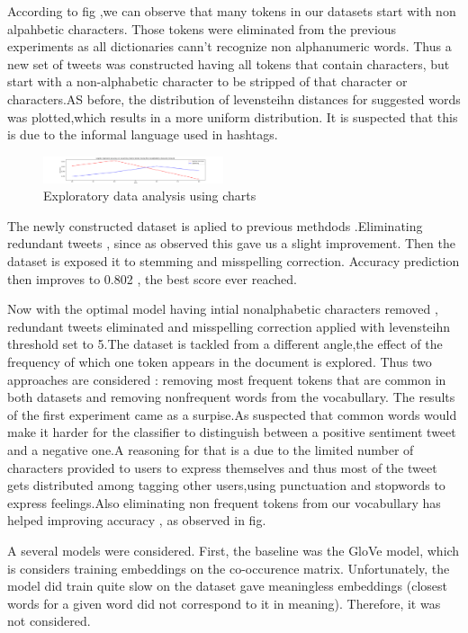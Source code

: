 \documentclass[10pt,conference,compsocconf]{IEEEtran}
\begin{document}
According to fig ,we can observe that many tokens in our datasets start with non alpahbetic characters. Those tokens were eliminated from the previous experiments as all dictionaries cann't recognize non alphanumeric words. Thus  a new set of tweets was constructed having all tokens that contain characters, but start with a non-alphabetic character to be stripped of that character or characters.AS before, the distribution of levensteihn distances for suggested words was plotted,which results in a more uniform distribution. It is suspected that this is due to the informal language used in hashtags. 
\begin{figure}[!htb]
	\centering \includegraphics[width=200px]{../plots/filtered_text.png}
	\caption{Exploratory data analysis using charts}
	\label{fig:data}
\end{figure}
The newly constructed dataset is aplied to previous methdods .Eliminating redundant tweets , since as observed this gave us a slight improvement. Then the dataset is exposed it to stemming and misspelling correction. Accuracy prediction then improves to 0.802 , the best score ever reached.

Now with the optimal model having intial nonalphabetic characters removed , redundant tweets eliminated and misspelling correction applied with levensteihn threshold set to 5.The dataset is tackled from a different angle,the effect of the frequency of which one token appears in the document is explored. Thus two approaches are considered : removing most frequent tokens that are common in both datasets and removing nonfrequent words from the vocabullary. The results of the first experiment came as a surpise.As suspected that common words would make it harder for the classifier to distinguish between a positive sentiment tweet and a negative one.A reasoning for that is a due to the limited number of characters provided to users to express themselves and thus most of the tweet gets distributed among tagging other users,using punctuation and stopwords to express feelings.Also eliminating non frequent tokens from our vocabullary has helped improving accuracy , as observed in fig.    

A several models were considered. First, the baseline was the GloVe \cite{glove} model, which is considers training embeddings on the co-occurence matrix. Unfortunately, the model did train quite slow on the dataset gave meaningless embeddings (closest words for a given word did not correspond to it in meaning). Therefore, it was not considered.
\end{document}
